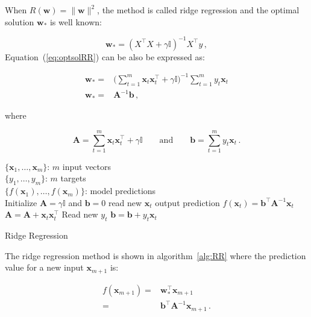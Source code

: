 When $R(\mathbf{w}) = \| \mathbf{w}\| ^2$, the method is called ridge
regression and the optimal solution $\mathbf{w}_*$ is well known: 

\begin{equation}
\label{eq:optsolRR}
\mathbf{w}_*=(X^\intercal X+\gamma \mathbb{I})^{-1}X^\intercal y \, ,
\end{equation}
Equation~(\ref{eq:optsolRR}) can be also be expressed as:

\begin{eqnarray*}
\mathbf{w}_* =& \displaystyle \big (\sum_{t=1}^m \mathbf{x}_t \mathbf{x}_t  ^\intercal + \gamma
\mathbb{I}\big )^{-1} \sum_{t=1}^m y_t \mathbf{x}_t \\
\mathbf{w}_* =& \mathbf{A}^{-1}\mathbf{b}\, ,
\end{eqnarray*}

\noindent where


\[ 
\mathbf{A}= \sum_{t=1}^m \mathbf{x}_t \mathbf{x}_t  ^\intercal +
\gamma \mathbb{I} 
\qquad \text{and} \qquad 
\mathbf{b}=  \sum_{t=1}^m y_t \mathbf{x}_t 
\, .\]



\begin{algorithm}[H]
\begin{algorithmic}[1]
\REQUIRE $\,$ \\
$\{\mathbf{x}_1,\dots,\mathbf{x}_{m} \}$: $m$ input vectors \\
$\{y_1,\dots,y_{m} \}$: $m$ targets \\
\ENSURE  $\,$ \\
$\{f(\mathbf{x}_1),\dots,f(\mathbf{x}_{m}) \}$: model predictions \\
\STATE Initialize $\mathbf{A}=\gamma \mathbb{I}$
and $\mathbf{b}=0$
	\STATE read new $\mathbf{x}_t$
	\STATE output prediction $f(\mathbf{x}_t) =  \mathbf{b}^\intercal \mathbf{A}^{-1}\mathbf{x}_t$
   	\STATE $\mathbf{A} = \mathbf{A} + \mathbf{x}_t \mathbf{x}_t^\intercal$
   	\STATE Read new $y_t$
    	\STATE $\mathbf{b} = \mathbf{b} + y_t \mathbf{x}_t$
\ENDFOR

\end{algorithmic}
\caption{Ridge Regression}
\label{alg:RR}
\end{algorithm}

The ridge regression method is shown in algorithm~\ref{alg:RR} where
the prediction value for a new input $\mathbf{x}_{m+1}$ is:

\begin{eqnarray*}
f(\mathbf{x}_{m+1}) =& \mathbf{w}_*^\intercal \mathbf{x}_{m+1} \\
  =& \mathbf{b}^\intercal \mathbf{A}^{-1} \mathbf{x}_{m+1}
\, .
\end{eqnarray*}




